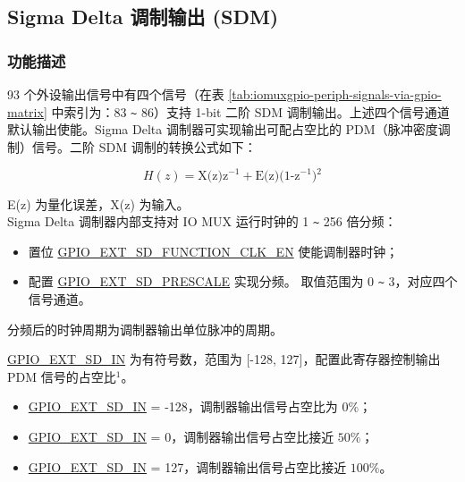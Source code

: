 \documentclass[main\_\_CN.tex]{subfiles}
\begin{document}
\subsection{Sigma Delta 调制输出 (SDM)}

\subsubsection{功能描述}

93 个外设输出信号中有四个信号（在表 \ref{tab:iomuxgpio-periph-signals-via-gpio-matrix} 中索引为：83 \verb+~+ 86）支持 1-bit 二阶 SDM 调制输出。上述四个信号通道默认输出使能。Sigma Delta 调制器可实现输出可配占空比的 PDM（脉冲密度调制）信号。二阶 SDM 调制的转换公式如下：

\[
    H(z)=\textrm{X(z)z$^{-1}$} + \textrm{E(z)(1-z$^{-1}$)$^{2}$}
    \]

E(z) 为量化误差，X(z) 为输入。\\
Sigma Delta 调制器内部支持对 IO MUX 运行时钟的 1 \verb+~+ 256 倍分频： 

\begin{itemize}
    \item 置位 \hyperref[fielddesc:GPIOSDFUNCTIONCLKEN]{GPIO\_EXT\_SD\_FUNCTION\_CLK\_EN} 使能调制器时钟；
    \item 配置 \hyperref[fielddesc:GPIOSDSD0PRESCALE]{GPIO\_EXT\_SD\_PRESCALE} 实现分频。 取值范围为 0 \verb+~+ 3，对应四个信号通道。
\end{itemize}

分频后的时钟周期为调制器输出单位脉冲的周期。

\hyperref[fielddesc:GPIOSDSD0IN]{GPIO\_EXT\_SD\_IN} 为有符号数，范围为 [-128, 127]，配置此寄存器控制输出 PDM 信号的占空比$^{1}$。

\begin{itemize}
    \item \hyperref[fielddesc:GPIOSDSD0IN]{GPIO\_EXT\_SD\_IN} = -128，调制器输出信号占空比为 \begin{math}0\% \end{math}；
    \item \hyperref[fielddesc:GPIOSDSD0IN]{GPIO\_EXT\_SD\_IN} = 0，调制器输出信号占空比接近 \begin{math}50\% \end{math}；
    \item \hyperref[fielddesc:GPIOSDSD0IN]{GPIO\_EXT\_SD\_IN} = 127，调制器输出信号占空比接近 \begin{math}100\% \end{math}。
\end{itemize}
\end{document}
